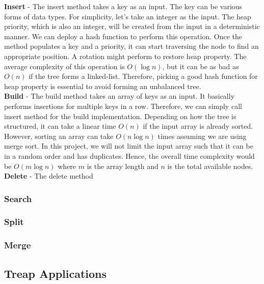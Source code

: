 \noindent \textbf{Insert} - The insert method takes a key as an input. The key can be various forms of data types. For simplicity, let's take an integer as the input. The heap priority, which is also an integer, will be created from the input in a deterministic manner. We can deploy a hash function to perform this operation. Once the method populates a key and a priority, it can start traversing the node to find an appropriate position. A rotation might perform to restore heap property. The average complexity of this operation is $O(\log n)$, but it can be as bad as $O(n)$ if the tree forms a linked-list. Therefore, picking a good hash function for heap property is essential to avoid forming an unbalanced tree.\\

\noindent \textbf{Build} - The build method takes an array of keys as an input. It basically performs insertions for multiple keys in a row. Therefore, we can simply call insert method for the build implementation. Depending on how the tree is structured, it can take a linear time $O(n)$ if the input array is already sorted. However, sorting an array can take $O(n \log n)$ times assuming we are using merge sort. In this project, we will not limit the input array such that it can be in a random order and has duplicates. Hence, the overall time complexity would be $O(m \log n)$ where $m$ is the array length and $n$ is the total available nodes.\\

\textbf{Delete} - The delete method 
\subsubsection{Search}
\subsubsection{Split}
\subsubsection{Merge}

\subsection{Treap Applications}



